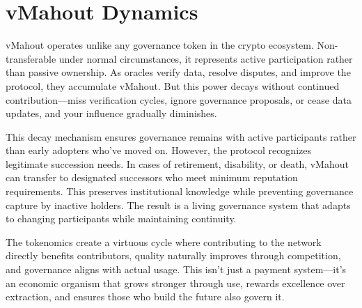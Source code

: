 \section{vMahout Dynamics}

vMahout operates unlike any governance token in the crypto ecosystem. Non-transferable under normal circumstances, it represents active participation rather than passive ownership. As oracles verify data, resolve disputes, and improve the protocol, they accumulate vMahout. But this power decays without continued contribution---miss verification cycles, ignore governance proposals, or cease data updates, and your influence gradually diminishes.

This decay mechanism ensures governance remains with active participants rather than early adopters who've moved on. However, the protocol recognizes legitimate succession needs. In cases of retirement, disability, or death, vMahout can transfer to designated successors who meet minimum reputation requirements. This preserves institutional knowledge while preventing governance capture by inactive holders. The result is a living governance system that adapts to changing participants while maintaining continuity.

The tokenomics create a virtuous cycle where contributing to the network directly benefits contributors, quality naturally improves through competition, and governance aligns with actual usage. This isn't just a payment system---it's an economic organism that grows stronger through use, rewards excellence over extraction, and ensures those who build the future also govern it.